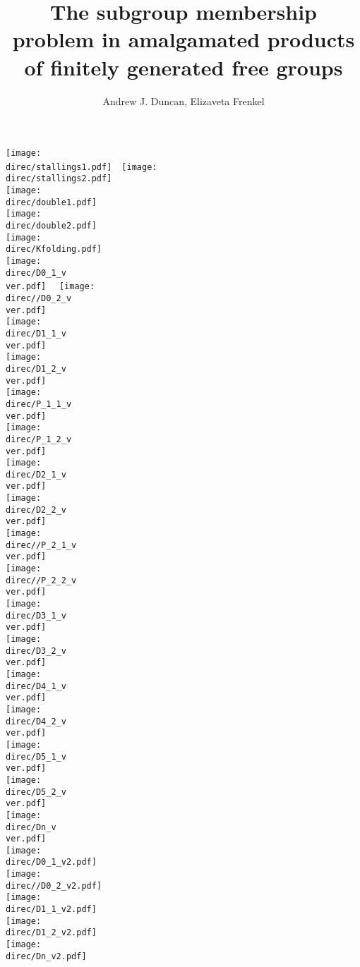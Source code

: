 \documentclass[a4paper,12pt]{article}
\title{The subgroup membership problem in amalgamated products of 
finitely generated free groups
}
\author{Andrew J. Duncan, Elizaveta Frenkel}
\newcommand{\direc}{cex}
\newcommand{\ver}{1}
\numberwithin{equation}{section}
\numberwithin{figure}{section}
\begin{document}
\texttt{[image: \\direc/stallings1.pdf]}~~\texttt{[image: \\direc/stallings2.pdf]}\\
\texttt{[image: \\direc/double1.pdf]}\\
\texttt{[image: \\direc/double2.pdf]}\\
\texttt{[image: \\direc/Kfolding.pdf]}\\
\texttt{[image: \\direc/D0\_1\_v\\ver.pdf]}~~
\texttt{[image: \\direc//D0\_2\_v\\ver.pdf]}\\
\texttt{[image: \\direc/D1\_1\_v\\ver.pdf]}\\
\texttt{[image: \\direc/D1\_2\_v\\ver.pdf]}\\
\texttt{[image: \\direc/P\_1\_1\_v\\ver.pdf]}\\
\texttt{[image: \\direc/P\_1\_2\_v\\ver.pdf]}\\
\texttt{[image: \\direc/D2\_1\_v\\ver.pdf]}\\
\texttt{[image: \\direc/D2\_2\_v\\ver.pdf]}\\
\texttt{[image: \\direc//P\_2\_1\_v\\ver.pdf]}\\
\texttt{[image: \\direc//P\_2\_2\_v\\ver.pdf]}\\
\texttt{[image: \\direc/D3\_1\_v\\ver.pdf]}\\
\texttt{[image: \\direc/D3\_2\_v\\ver.pdf]}\\
\texttt{[image: \\direc/D4\_1\_v\\ver.pdf]}\\
\texttt{[image: \\direc/D4\_2\_v\\ver.pdf]}\\
\texttt{[image: \\direc/D5\_1\_v\\ver.pdf]}\\
\texttt{[image: \\direc/D5\_2\_v\\ver.pdf]}\\
\texttt{[image: \\direc/Dn\_v\\ver.pdf]}\\
\texttt{[image: \\direc/D0\_1\_v2.pdf]}\\
\texttt{[image: \\direc//D0\_2\_v2.pdf]}\\
\texttt{[image: \\direc/D1\_1\_v2.pdf]}\\
\texttt{[image: \\direc/D1\_2\_v2.pdf]}\\
\texttt{[image: \\direc/Dn\_v2.pdf]}\\
\end{document}

